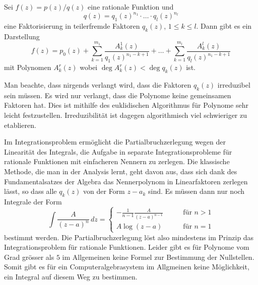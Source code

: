 \begin{satz}[Partialbruchzerlegung]
\label{buch:analytisch:rational:satz:partialbruchzerlegung}
Sei $f(z) = p(z)/q(z)$ eine rationale Funktion und 
\[
q(z)
=
q_1(z)^{n_1}
\cdot\ldots\cdot
q_l(z)^{n_l}
\]
eine Faktorisierung in teilerfremde Faktoren $q_k(z)$, $1\le k\le l$.
Dann gibt es ein Darstellung
\[
f(z)
=
p_0(z)
+
\sum_{k=1}^{m_1}
\frac{A_k^1(z)}{q_1(z)^{n_1-k+1}}
+
\ldots
+
\sum_{k=1}^{m_l}
\frac{A_k^l(z)}{q_l(z)^{n_1-k+1}}
\]
mit Polynomen $A_k^r(z)$
wobei $\deg A_k^r(z) < \deg q_k(z)$ ist.
\end{satz}

Man beachte, dass nirgends verlangt wird, dass die Faktoren 
$q_k(z)$ irreduzibel sein müssen.
Es wird nur verlangt, dass die Polynome keine gemeinsamen
Faktoren hat.
Dies ist mithilfe des euklidischen Algorithmus für Polynome
sehr leicht festzustellen.
Irreduzibilität ist dagegen algorithmisch viel schwieriger
zu etablieren.

Im Integrationsproblem ermöglicht die Partialbruchzerlegung
wegen der Linearität des Integrals, die Aufgabe in separate
Integrationsprobleme für rationale Funktionen mit
einfacheren Nennern zu zerlegen.
Die klassische Methode, die man in der Analysis lernt,
geht davon aus, dass sich dank des Fundamentalsatzes der Algebra
das Nennerpolynom in Linearfaktoren zerlegen lässt, so dass alle
$q_k(z)$ von der Form $z-a_k$ sind.
Es müssen dann nur noch Integrale der Form
\[
\int
\frac{A}{(z-a)^n}
\,dz
=
\begin{cases}
\displaystyle-\frac{1}{n-1} \frac{A}{(z-a)^{n-1}}&\qquad\text{für $n>1$} \\
A\log (z-a)                                      &\qquad\text{für $n=1$}
\end{cases}
\]
bestimmt werden.
Die Partialbruchzerlegung löst also mindestens im Prinzip
das Integrationsproblem für rationale Funktionen.
Leider gibt es für Polynome vom Grad grösser als $5$ im
Allgemeinen keine Formel zur Bestimmung der Nullstellen.
Somit gibt es für ein Computeralgebrasystem im Allgmeinen
keine Möglichkeit, ein Integral auf diesem Weg zu bestimmen.

%
%
